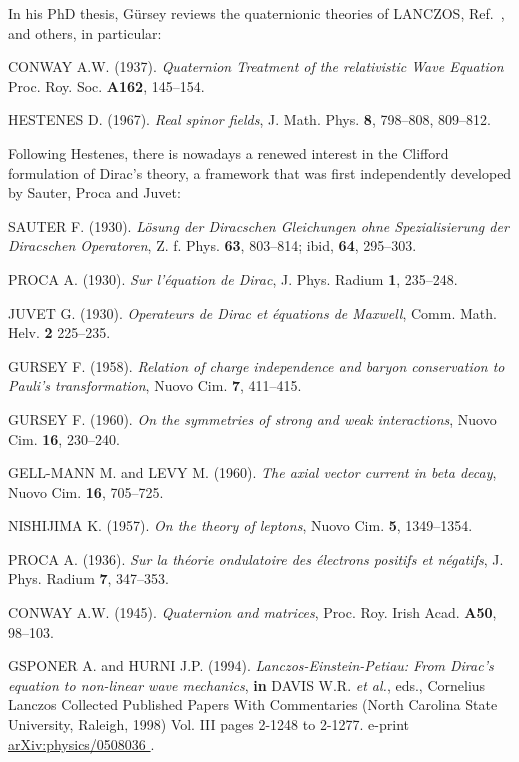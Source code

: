 \documentclass [12pt,a4paper      ]{article}
\begin{document}
\begin{enumerate}
In  his PhD thesis,  G\"ursey reviews the quaternionic theories  of 
LANCZOS, Ref.~\cite{R26}, and others, in particular:

CONWAY   A.W.  (1937). \emph{Quaternion Treatment of the relativistic Wave 
Equation}  Proc. Roy. Soc.   {\bf A162}, 145--154.

 HESTENES D.  (1967). \emph{Real spinor fields}, J. Math. Phys.  {\bf 8}, 798--808, 809--812. 

Following Hestenes,  there is  nowadays a renewed interest in the 
Clifford  formulation  of Dirac's theory,  a framework  that  was 
first independently developed by Sauter, Proca and Juvet:

SAUTER   F.   (1930). \emph{L\"osung  der Diracschen   Gleichungen   ohne 
Spezialisierung der Diracschen Operatoren},  Z. f. Phys.   {\bf 63}, 803--814;  ibid,  {\bf 64}, 295--303.

PROCA A.  (1930). \emph{Sur l'\'equation de Dirac},  J.  Phys. Radium   {\bf 1}, 235--248.

JUVET G.  (1930). \emph{Operateurs de Dirac et \'equations de Maxwell}, Comm. 
Math. Helv.  {\bf 2} 225--235.
 
  GURSEY F.  (1958). \emph{Relation of charge independence and  baryon conservation to Pauli's transformation}, Nuovo Cim.   {\bf 7}, 411--415.

  GURSEY  F.  (1960). \emph{On  the symmetries  of  strong  and  weak interactions},  Nuovo Cim.   {\bf 16}, 230--240.

GELL-MANN M.  and  LEVY  M. (1960). \emph{The axial vector current in beta 
decay},  Nuovo Cim.   {\bf 16}, 705--725.

 NISHIJIMA K.  (1957). \emph{On the theory of leptons},  Nuovo Cim. {\bf 5}, 1349--1354.

  PROCA  A.  (1936). \emph{Sur la th\'eorie ondulatoire  des  \'electrons positifs et n\'egatifs},  J. Phys. Radium   {\bf 7}, 347--353.

CONWAY A.W. (1945). \emph{Quaternion and matrices},  Proc. Roy. Irish Acad.  
 {\bf A50}, 98--103.

  GSPONER A. and HURNI J.P. (1994). \emph{Lanczos-Einstein-Petiau: From Dirac's equation to non-linear wave mechanics}, {\bf in} DAVIS W.R. \emph{et al.}, eds., Cornelius Lanczos Collected Published Papers With Commentaries (North Ca\-rolina State University, Raleigh, 1998) Vol. III pages 2-1248 to 2-1277.  e-print \underline{ arXiv:physics/0508036 }.


\end{enumerate}
\end{document}
